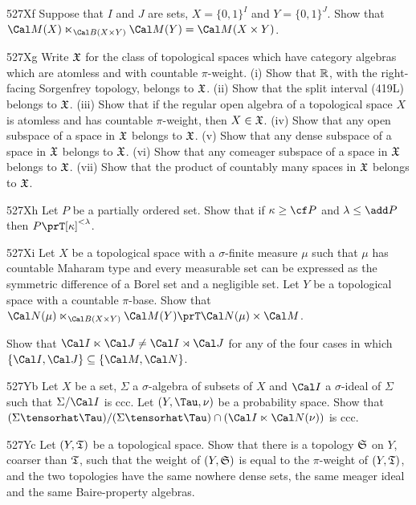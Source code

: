 {\sqheader 527Xf Suppose that $I$ and $J$ are sets,
$X=\{0,1\}^I$ and $Y=\{0,1\}^J$.   Show that
$\Cal M(X)\ltimes_{\Cal B(X\times Y)}\Cal M(Y)=\Cal M(X\times Y)$.

\spheader 527Xg Write $\frak X$ for the class of topological spaces
which have category algebras which are atomless and with countable
$\pi$-weight.   (i) Show that $\Bbb R$, with the right-facing Sorgenfrey
topology, belongs to $\frak X$.   (ii) Show that the split interval
(419L) belongs to $\frak X$.   (iii) Show that if the regular open
algebra of a topological space $X$ is atomless and has countable
$\pi$-weight, then $X\in\frak X$.   (iv) Show that any open subspace of
a space in $\frak X$ belongs to $\frak X$.   (v) Show that any dense
subspace of a space in $\frak X$ belongs to $\frak X$.
(vi) Show that any comeager subspace of a space in $\frak X$ belongs to
$\frak X$.
(vii) Show that the product of countably many spaces in $\frak X$
belongs to $\frak X$.

\spheader 527Xh Let $P$ be a partially ordered set.   Show that if
$\kappa\ge\cf P$ and $\lambda\le\add P$ then $P\prT[\kappa]^{<\lambda}$.

\spheader 527Xi Let $X$ be a topological space with a $\sigma$-finite
measure $\mu$ such that $\mu$ has countable Maharam type and every
measurable set can be expressed as the
symmetric difference of a Borel set and a negligible set.   Let
$Y$ be a topological space with a countable $\pi$-base.   Show that
$\Cal N(\mu)\ltimes_{\Cal B(X\times Y)}\Cal M(Y)\prT\Cal N(\mu)\times\Cal M$.

Show that
$\Cal I\ltimes\Cal J\ne\Cal I\rtimes\Cal J$ for any of the four cases in
which $\{\Cal I,\Cal J\}\subseteq\{\Cal M,\Cal N\}$.

\spheader 527Yb Let $X$ be a set, $\Sigma$ a $\sigma$-algebra of subsets of $X$ and
$\Cal I$ a $\sigma$-ideal of $\Sigma$ such that $\Sigma/\Cal I$ is ccc.
Let $(Y,\Tau,\nu)$ be a probability space.   Show that
$(\Sigma\tensorhat\Tau)/(\Sigma\tensorhat\Tau)\cap(\Cal I\ltimes\Cal N(\nu))$ is ccc.

\spheader 527Yc
Let $(Y,\frak T)$ be a topological space.   Show that there
is a topology $\frak S$ on $Y$, coarser than $\frak T$, such that the
weight of $(Y,\frak S)$ is equal to the $\pi$-weight of $(Y,\frak T)$, and
the two topologies have the same nowhere dense sets, the same meager ideal
and the same Baire-property algebras.

}
